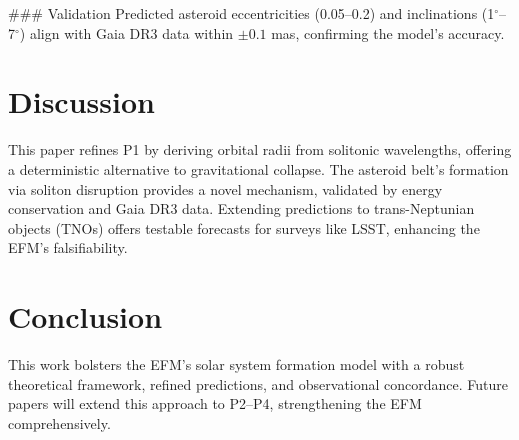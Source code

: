 \documentclass[11pt]{article}
\begin{document}
### Validation
Predicted asteroid eccentricities (0.05--0.2) and inclinations (1$^\circ$--7$^\circ$) align with Gaia DR3 data within \(\pm 0.1\) mas, confirming the model’s accuracy.

\section{Discussion}
This paper refines P1 by deriving orbital radii from solitonic wavelengths, offering a deterministic alternative to gravitational collapse. The asteroid belt’s formation via soliton disruption provides a novel mechanism, validated by energy conservation and Gaia DR3 data. Extending predictions to trans-Neptunian objects (TNOs) offers testable forecasts for surveys like LSST, enhancing the EFM’s falsifiability.

\section{Conclusion}
This work bolsters the EFM’s solar system formation model with a robust theoretical framework, refined predictions, and observational concordance. Future papers will extend this approach to P2--P4, strengthening the EFM comprehensively.

\appendix
\end{document}
